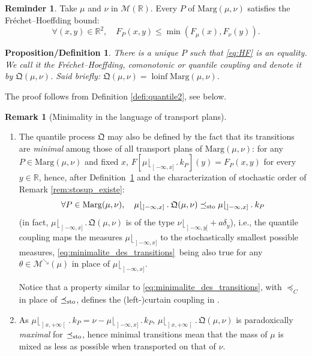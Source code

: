 \documentclass[11pt]{article}
\newcommand{\ie}{i.e.,\xspace}
\newcommand{\skpt}{\smallskip}
\newcommand{\ldot}{\mathbin{.}}
\theoremstyle{plain}
\newtheorem{prodefinition}[them]{Proposition/Definition}
\theoremstyle{definition}
\newtheorem{rem}[them]{Remark}
\newtheorem{reminder}[them]{Reminder}
\newcommand{\como}{\mathfrak{Q}}
\newcommand{\m}{\mathcal{M}}
\newcommand{\ma}{\mathrm{Marg}}
\newcommand{\R}{\mathbb{R}}
\newcommand{\lcinf}{\operatorname{loinf}}
\newcommand{\leqc}{\preceq_{C}}
\newcommand{\leqs}{\preceq_{\text{\rm sto}}}
\newcommand{\mdec}{\mathcal{M}^{\scriptscriptstyle\searrow}}
\newcommand{\op}{\mathopen}
\newcommand{\clo}{\mathclose}
\begin{document}
\begin{reminder}Take $\mu$ and $\nu$ in $\m(\R)$. Every $P$ of $\ma(\mu,\nu)$ satisfies the Fréchet--Hoeffding bound:
\begin{equation}\label{eq:HF}
\forall(x,y)\in\R^2,\quad F_P(x,y)\leq \min(F_\mu(x),F_\nu(y)).
\end{equation}
\end{reminder}

\begin{prodefinition}\label{defi:quantile1}There is a unique $P$ such that \eqref{eq:HF} is an equality. We call it the Fréchet--Hoeffding, comonotonic or \emph{quantile coupling} and denote it by $\como(\mu,\nu)$. Said briefly: $\como(\mu,\nu)=\lcinf \ma(\mu,\nu)$.
\end{prodefinition}

The proof follows from Definition \ref{defi:quantile2}, see below.

\skpt
\begin{rem}[Minimality in the language of transport plans]\label{rem:q_is_mini}
\begin{enumerate}
\item
The quantile process $\como$ may also be defined by the fact that its transitions are \emph{minimal} among those of all transport plans of $\ma(\mu,\nu)$: for any $P\in\ma(\mu,\nu)$ and fixed $x$, $F[\mu\lfloor_{\op]-\infty,x]}{}\ldot k_P](y)= F_P(x,y)$ for every $y\in \R$, hence, after Definition~\ref{defi:quantile1} and the characterization of stochastic order of Remark \ref{rem:stosup_existe}:
\begin{equation}\label{eq:minimalite_des_transitions}\forall P\in\ma(\mu,\nu),\quad\mu\lfloor_{\op]-\infty,x]}{}{}\ldot\como(\mu,\nu)\leqs\mu\lfloor_{\op]-\infty,x]}{}{}\ldot k_P
\end{equation}
(in fact, $\mu\lfloor_{\op]-\infty,x]}{}{}\ldot\como(\mu,\nu)$ is of the type $\nu\lfloor_{\op]-\infty,y[}+a\delta_y$), \ie the quantile coupling maps the measures $\mu\lfloor_{\op]-\infty,x]}$ to the stochastically smallest possible measures, \eqref{eq:minimalite_des_transitions}~being also true for any $\theta\in \mdec(\mu)$ in place of $\mu\lfloor_{\op]-\infty,x]}$.

Notice that a property similar to \eqref{eq:minimalite_des_transitions}, with $\leqc$ in place of $\leqs$, defines the (left\nobreakdash-)curtain coupling in \cite{BJ}.

\item
As $\mu\lfloor_{\op]x,+\infty\clo[}{}{}\ldot k_P=\nu-\mu\lfloor_{\op]-\infty,x]}{}{}\ldot k_{P}$, $\mu\lfloor_{\op]x,+\infty\clo[}{}{}\ldot\como(\mu,\nu)$ is paradoxically \emph{maximal} for $\leqs$, hence minimal transitions mean that the mass of $\mu$ is mixed as less as possible when transported on that of $\nu$.
\end{enumerate}
\end{rem}
\end{document}
